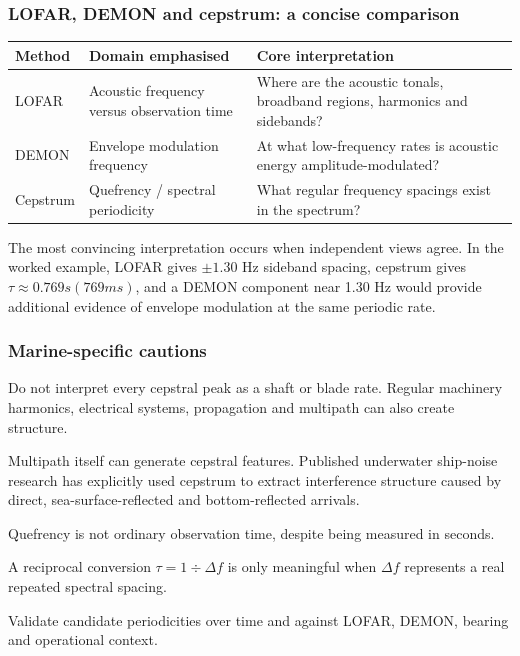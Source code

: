 \subsubsection{LOFAR, DEMON and cepstrum: a concise comparison}

\begin{tabularx}{\linewidth}{X X X}
    \toprule
    \textbf{Method} & \textbf{Domain emphasised} & Core interpretation \\
    \midrule
    \rowcolor[gray]{0.8}LOFAR & Acoustic frequency versus observation time & Where are the acoustic tonals, broadband regions, harmonics and sidebands? \\
    DEMON & Envelope modulation frequency & At what low-frequency rates is acoustic energy amplitude-modulated? \\
    \rowcolor[gray]{0.8}Cepstrum & Quefrency / spectral periodicity & What regular frequency spacings exist in the spectrum?\\
    \bottomrule
\end{tabularx}

\begin{learnpoint}
    The most convincing interpretation occurs when independent views agree. In the worked example, LOFAR gives $\pm1.30$ Hz sideband spacing, cepstrum gives $\tau \approx 0.769s (769ms)$, and a DEMON component near 1.30 Hz would provide additional evidence of envelope modulation at the same periodic rate.
\end{learnpoint}

\subsubsection{Marine-specific cautions}

\begin{compactitem}
    \item Do not interpret every cepstral peak as a shaft or blade rate. Regular machinery harmonics, electrical systems, propagation and multipath can also create structure.
    \item Multipath itself can generate cepstral features. Published underwater ship-noise research has explicitly used cepstrum to extract interference structure caused by direct, sea-surface-reflected and bottom-reflected arrivals.
    \item Quefrency is not ordinary observation time, despite being measured in seconds.
    \item A reciprocal conversion $\tau = 1 \div \Delta f$ is only meaningful when $\Delta f$ represents a real repeated spectral spacing.
    \item Validate candidate periodicities over time and against LOFAR, DEMON, bearing and operational context.
\end{compactitem}

